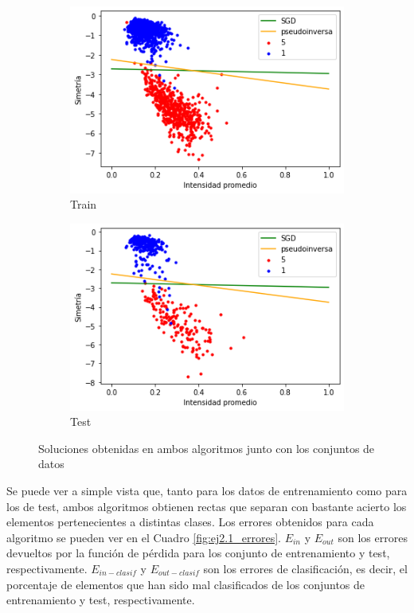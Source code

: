 \documentclass[10pt,a4paper]{article}
\begin{document}
\begin{figure}[h]
	\begin{subfigure}{0.5\textwidth}
		\centering
		\includegraphics[width=\textwidth]{ej2.1_solucion_train}
		\caption{Train}
	\end{subfigure}
	\begin{subfigure}{0.5\textwidth}
		\centering
		\includegraphics[width=\textwidth]{ej2.1_solucion_test}
		\caption{Test}
	\end{subfigure}
	\caption{Soluciones obtenidas en ambos algoritmos junto con los conjuntos de datos}
	\label{fig:ej2.1_soluciones}
\end{figure}

Se puede ver a simple vista que, tanto para los datos de entrenamiento como para los de test, ambos algoritmos obtienen rectas que separan con bastante acierto los elementos pertenecientes a distintas clases. Los errores obtenidos para cada algoritmo se pueden ver en el Cuadro \ref{fig:ej2.1_errores}. $E_{in}$ y $E_{out}$ son los errores devueltos por la función de pérdida para los conjunto de entrenamiento y test, respectivamente. $E_{in-clasif}$ y $E_{out-clasif}$ son los errores de clasificación, es decir, el porcentaje de elementos que han sido mal clasificados de los conjuntos de entrenamiento y test, respectivamente.
\end{document}
